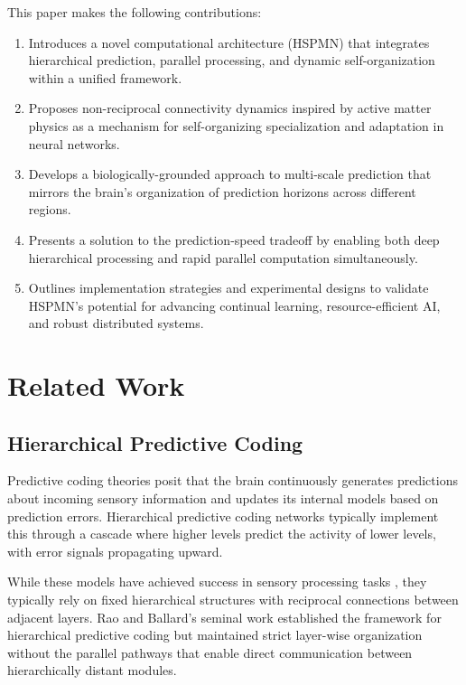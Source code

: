 \documentclass[11pt,a4paper,twocolumn]{article}
\begin{document}
This paper makes the following contributions:

\begin{enumerate}
    \item Introduces a novel computational architecture (HSPMN) that integrates hierarchical prediction, parallel processing, and dynamic self-organization within a unified framework.

    \item Proposes non-reciprocal connectivity dynamics inspired by active matter physics as a mechanism for self-organizing specialization and adaptation in neural networks.

    \item Develops a biologically-grounded approach to multi-scale prediction that mirrors the brain's organization of prediction horizons across different regions.

    \item Presents a solution to the prediction-speed tradeoff by enabling both deep hierarchical processing and rapid parallel computation simultaneously.

    \item Outlines implementation strategies and experimental designs to validate HSPMN's potential for advancing continual learning, resource-efficient AI, and robust distributed systems.
\end{enumerate}

\section{Related Work}

\subsection{Hierarchical Predictive Coding}

Predictive coding theories \cite{friston2005theory, clark2013whatever} posit that the brain continuously generates predictions about incoming sensory information and updates its internal models based on prediction errors. Hierarchical predictive coding networks typically implement this through a cascade where higher levels predict the activity of lower levels, with error signals propagating upward.

While these models have achieved success in sensory processing tasks \cite{kietzmann2019recurrence}, they typically rely on fixed hierarchical structures with reciprocal connections between adjacent layers. Rao and Ballard's seminal work \cite{rao1999predictive} established the framework for hierarchical predictive coding but maintained strict layer-wise organization without the parallel pathways that enable direct communication between hierarchically distant modules.
\end{document}
